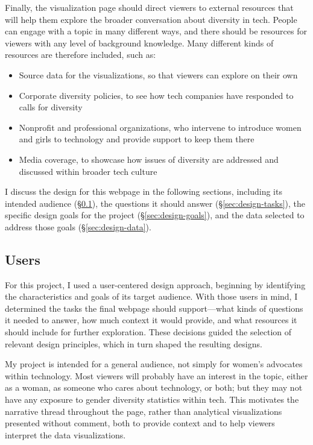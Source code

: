 Finally, the visualization page should direct viewers to external resources that will help them explore the broader conversation about diversity in tech. People can engage with a topic in many different ways, and there should be resources for viewers with any level of background knowledge. Many different kinds of resources are therefore included, such as:
\begin{itemize}
  \item Source data for the visualizations, so that viewers can explore on their own
  \item Corporate diversity policies, to see how tech companies have responded to calls for diversity
  \item Nonprofit and professional organizations, who intervene to introduce women and girls to technology and provide support to keep them there
  \item Media coverage, to showcase how issues of diversity are addressed and discussed within broader tech culture
\end{itemize}

I discuss the design for this webpage in the following sections, including its intended audience (\S\ref{sec:design-users}), the questions it should answer (\S\ref{sec:design-tasks}), the specific design goals for the project (\S\ref{sec:design-goals}), and the data selected to address those goals (\S\ref{sec:design-data}).



\subsection{Users}\label{sec:design-users}
For this project, I used a user-centered design approach, beginning by identifying the characteristics and goals of its target audience. With those users in mind, I determined the tasks the final webpage should support---what kinds of questions it needed to answer, how much context it would provide, and what resources it should include for further exploration. These decisions guided the selection of relevant design principles, which in turn shaped the resulting designs.

My project is intended for a general audience, not simply for women's advocates within technology. Most viewers will probably have an interest in the topic, either as a woman, as someone who cares about technology, or both; but they may not have any exposure to gender diversity statistics within tech. This motivates the narrative thread throughout the page, rather than analytical visualizations presented without comment, both to provide context and to help viewers interpret the data visualizations.

